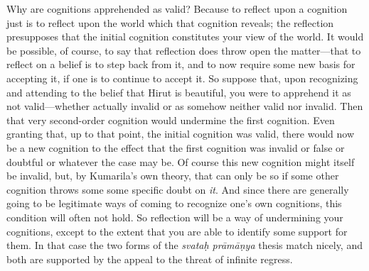 ﻿\documentclass[11pt]{amsart}
\begin{document}
Why are cognitions apprehended as valid? Because to reflect upon a cognition just is to reflect upon the world which that cognition reveals; the reflection presupposes that the initial cognition constitutes your view of the world. It would be possible, of course, to say that reflection does throw open the matter---that to reflect on a belief is to step back from it, and to now require some new basis for accepting it, if one is to continue to accept it. So suppose that, upon recognizing and attending to the belief that Hirut is beautiful, you were to apprehend it as not valid---whether actually invalid or as somehow neither valid nor invalid. Then that very second-order cognition would undermine the first cognition. Even granting that, up to that point, the initial cognition was valid, there would now be a new cognition to the effect that the first cognition was invalid or false or doubtful or whatever the case may be. Of course this new cognition might itself be invalid, but, by Kumarila's own theory, that can only be so if some other cognition throws some some specific doubt on \emph{it}. And since there are generally going to be legitimate ways of coming to recognize one's own cognitions, this condition will often not hold. So reflection will be a way of undermining your cognitions, except to the extent that you are able to identify some support for them. In that case the two forms of the \emph{svata\d h pr\=am\=a\d nya} thesis match nicely, and both are supported by the appeal to the threat of infinite regress.%
\end{document}
